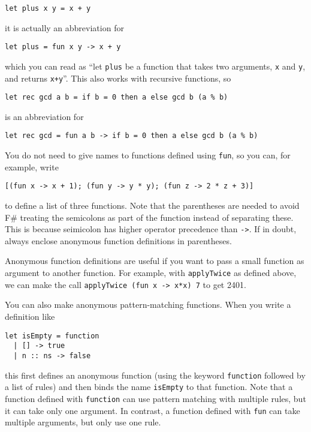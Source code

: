 \documentclass[a4paper]{article}
\begin{document}
\begin{verbatim}
let plus x y = x + y
\end{verbatim}

\noindent
it is actually an abbreviation for


\begin{verbatim}
let plus = fun x y -> x + y
\end{verbatim}

\noindent
which you can read as ``let \texttt{plus} be a function that takes two
arguments, \texttt{x} and  \texttt{y}, and returns \texttt{x+y}''.
This also works with recursive functions, so


\begin{verbatim}
let rec gcd a b = if b = 0 then a else gcd b (a % b)
\end{verbatim}

\noindent
is an abbreviation for

\begin{verbatim}
let rec gcd = fun a b -> if b = 0 then a else gcd b (a % b)
\end{verbatim}

\noindent
You do not need to give names to functions defined using \texttt{fun},
so you can, for example, write


\begin{verbatim}
[(fun x -> x + 1); (fun y -> y * y); (fun z -> 2 * z + 3)]
\end{verbatim}

\noindent
to define a list of three functions.  Note that the parentheses are
needed to avoid F\#{} treating the semicolons as part of the function
instead of separating these.  This is because seimicolon has higher
operator precedence than \texttt{->}.  If in doubt, always enclose
anonymous function definitions in parentheses.

Anonymous function definitions are useful if you want to pass a small
function as argument to another function.  For example, with
\texttt{applyTwice} as defined above, we can make the call
\texttt{applyTwice~(fun~x~->~x*x)~7} to get 2401.

You can also make anonymous pattern-matching functions.  When
you write a definition like


\begin{verbatim}
let isEmpty = function
  | [] -> true
  | n :: ns -> false
\end{verbatim}

\noindent
this first defines an anonymous function (using the keyword
\texttt{function} followed by a list of rules) and then binds the name
\texttt{isEmpty} to that function.  Note that a function defined with
\texttt{function} can use pattern matching with multiple rules, but it
can take only one argument.  In contrast, a function defined with
\texttt{fun} can take multiple arguments, but only use one rule.
\end{document}
